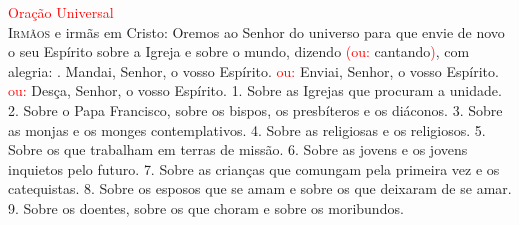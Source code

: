 \documentclass{book}
\begin{document}
\begin{flushleft}
    \textcolor{red}{Oração Universal}
    \vspace{.2cm} \\
    \lettrine[findent=2pt]{\color{red}I}{rmãos} e irmãs em Cristo:
    \newline
    Oremos ao Senhor do universo
    \newline
    para que envie de novo o seu Espírito
    \newline
    sobre a Igreja e sobre o mundo,
    \newline
    dizendo \textcolor{red}{(ou:} cantando\textcolor{red}{)}, com alegria:
    \vspace{.1cm}
    \newline
    {\color{red} \Rbar.} Mandai, Senhor, o vosso Espírito.
    \newline
    \textcolor{red}{ou:} Enviai, Senhor, o vosso Espírito.
    \newline
    \textcolor{red}{ou:} Desça, Senhor, o vosso Espírito.
    \vspace{.1cm}
    \newline
    {\color{red} 1.} Sobre as Igrejas que procuram a unidade.
    \vspace{.1cm}
    \newline
    {\color{red} 2.} Sobre o Papa Francisco, sobre os bispos, os presbíteros e os diáconos.
    \vspace{.1cm}
    \newline
    {\color{red} 3.} Sobre as monjas e os monges contemplativos.
    \vspace{.1cm}
    \newline
    {\color{red} 4.} Sobre as religiosas e os religiosos.
    \vspace{.1cm}
    \newline
    {\color{red} 5.} Sobre os que trabalham em terras de missão.
    \vspace{.1cm}
    \newline
    {\color{red} 6.} Sobre as jovens e os jovens inquietos pelo futuro.
    \vspace{.1cm}
    \newline
    {\color{red} 7.} Sobre as crianças que comungam pela primeira vez e os catequistas.
    \vspace{.1cm}
    \newline
    {\color{red} 8.} Sobre os esposos que se amam e sobre os que deixaram de se amar.
    \vspace{.1cm}
    \newline
    {\color{red} 9.} Sobre os doentes, sobre os que choram e sobre os moribundos.

\end{flushleft}
\end{document}
